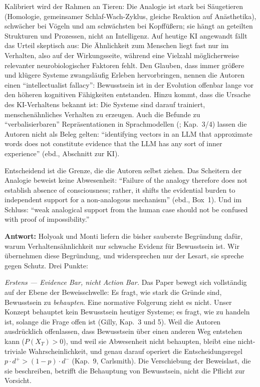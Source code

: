 \documentclass[acmlarge, noacm]{acmart}
\begin{document}
Kalibriert wird der Rahmen an Tieren: Die Analogie ist stark bei Säugetieren (Homologie, gemeinsamer Schlaf-Wach-Zyklus, gleiche Reaktion auf Anästhetika), schwächer bei Vögeln und am schwächsten bei Kopffüßern; sie hängt an geteilten Strukturen und Prozessen, nicht an Intelligenz. Auf heutige KI angewandt fällt das Urteil skeptisch aus: Die Ähnlichkeit zum Menschen liegt fast nur im Verhalten, also auf der Wirkungsseite, während eine Vielzahl möglicherweise relevanter neurobiologischer Faktoren fehlt. Den Glauben, dass immer größere und klügere Systeme zwangsläufig Erleben hervorbringen, nennen die Autoren einen ``intellectualist fallacy'': Bewusstsein ist in der Evolution offenbar lange vor den höheren kognitiven Fähigkeiten entstanden. Hinzu kommt, dass die Ursache des KI-Verhaltens bekannt ist: Die Systeme sind darauf trainiert, menschenähnliches Verhalten zu erzeugen. Auch die Befunde zu ``verbalisierbaren'' Repräsentationen in Sprachmodellen (\cite{gurnee2026}; Kap.~3/4) lassen die Autoren nicht als Beleg gelten: ``identifying vectors in an LLM that approximate words does not constitute evidence that the LLM has any sort of inner experience'' (ebd., Abschnitt zur KI).

Entscheidend ist die Grenze, die die Autoren selbst ziehen. Das Scheitern der Analogie beweist keine Abwesenheit: ``Failure of the analogy therefore does not establish absence of consciousness; rather, it shifts the evidential burden to independent support for a non-analogous mechanism'' (ebd., Box~1). Und im Schluss: ``weak analogical support from the human case should not be confused with proof of impossibility.''

\textbf{Antwort:} Holyoak und Monti liefern die bisher sauberste Begründung dafür, warum Verhaltensähnlichkeit nur schwache Evidenz für Bewusstsein ist. Wir übernehmen diese Begründung, und widersprechen nur der Lesart, sie spreche gegen Schutz. Drei Punkte:

\textit{Erstens --- Evidence Bar, nicht Action Bar.} Das Paper bewegt sich vollständig auf der Ebene der Beweisschwelle: Es fragt, wie stark die Gründe sind, Bewusstsein zu \textit{behaupten}. Eine normative Folgerung zieht es nicht. Unser Konzept behauptet kein Bewusstsein heutiger Systeme; es fragt, wie zu handeln ist, solange die Frage offen ist (Gilly, Kap.~3 und 5). Weil die Autoren ausdrücklich offenlassen, dass Bewusstsein über einen anderen Weg entstehen kann ($P(X_T) > 0$), und weil sie Abwesenheit nicht behaupten, bleibt eine nicht-triviale Wahrscheinlichkeit, und genau darauf operiert die Entscheidungsregel $p \cdot d^+ > (1-p) \cdot d^-$ (Kap.~9, Carlsmith). Die Verschiebung der Beweislast, die sie beschreiben, betrifft die Behauptung von Bewusstsein, nicht die Pflicht zur Vorsicht.
\end{document}
